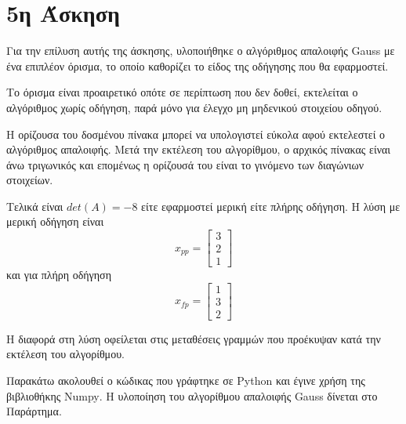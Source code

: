 \documentclass[assignment2.tex]{subfiles}
\begin{document}
\section*{5η Άσκηση}
Για την επίλυση αυτής της άσκησης, υλοποιήθηκε ο αλγόριθμος απαλοιφής \textlatin{Gauss} με ένα επιπλέον όρισμα, το οποίο καθορίζει το είδος της οδήγησης που θα εφαρμοστεί. 

Το όρισμα είναι προαιρετικό οπότε σε περίπτωση που δεν δοθεί, εκτελείται ο αλγόριθμος χωρίς οδήγηση, παρά μόνο για έλεγχο μη μηδενικού στοιχείου οδηγού.

Η ορίζουσα του δοσμένου πίνακα μπορεί να υπολογιστεί εύκολα αφού εκτελεστεί ο αλγόριθμος απαλοιφής. Μετά την εκτέλεση του αλγορίθμου, ο αρχικός πίνακας είναι άνω τριγωνικός και επομένως η ορίζουσά του είναι το γινόμενο των διαγώνιων στοιχείων.

Τελικά είναι $det(A)=-8$ είτε εφαρμοστεί μερική είτε πλήρης οδήγηση. Η λύση με μερική οδήγηση είναι
\begin{equation}
x_{pp} = \left[
\begin{matrix}
3 \\ 2 \\ 1
\end{matrix}
\right]
\end{equation}
και για πλήρη οδήγηση
\begin{equation}
x_{fp} = \left[
\begin{matrix}
1 \\ 3 \\ 2
\end{matrix}
\right]
\end{equation}

Η διαφορά στη λύση οφείλεται στις μεταθέσεις γραμμών που προέκυψαν κατά την εκτέλεση του αλγορίθμου.

Παρακάτω ακολουθεί ο κώδικας που γράφτηκε σε \textlatin{Python} και έγινε χρήση της βιβλιοθήκης \textlatin{Numpy}. Η υλοποίηση του αλγορίθμου απαλοιφής \textlatin{Gauss} δίνεται στο Παράρτημα.

\end{document}
